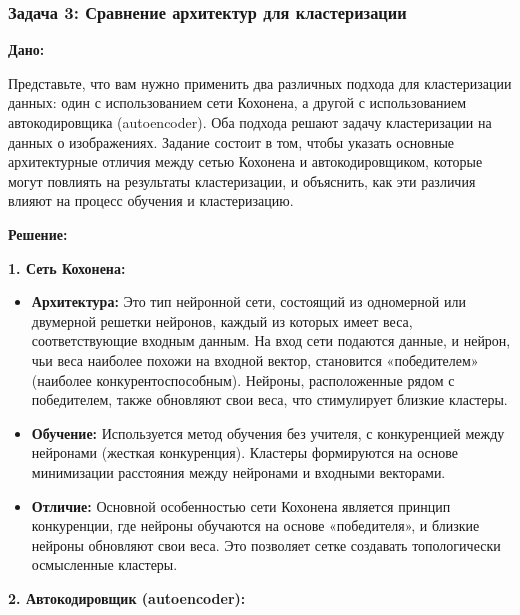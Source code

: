 \subsubsection{Задача 3: Сравнение архитектур для кластеризации}

\textbf{Дано:}

Представьте, что вам нужно применить два различных подхода для кластеризации данных: один с использованием сети Кохонена, а другой с использованием автокодировщика (autoencoder). Оба подхода решают задачу кластеризации на данных о изображениях. Задание состоит в том, чтобы указать основные архитектурные отличия между сетью Кохонена и автокодировщиком, которые могут повлиять на результаты кластеризации, и объяснить, как эти различия влияют на процесс обучения и кластеризацию.

\textbf{Решение:}

\textbf{1. Сеть Кохонена:}

\begin{itemize}
    \item \textbf{Архитектура:} Это тип нейронной сети, состоящий из одномерной или двумерной решетки нейронов, каждый из которых имеет веса, соответствующие входным данным. На вход сети подаются данные, и нейрон, чьи веса наиболее похожи на входной вектор, становится «победителем» (наиболее конкурентоспособным). Нейроны, расположенные рядом с победителем, также обновляют свои веса, что стимулирует близкие кластеры.
    \item \textbf{Обучение:} Используется метод обучения без учителя, с конкуренцией между нейронами (жесткая конкуренция). Кластеры формируются на основе минимизации расстояния между нейронами и входными векторами.
    \item \textbf{Отличие:} Основной особенностью сети Кохонена является принцип конкуренции, где нейроны обучаются на основе «победителя», и близкие нейроны обновляют свои веса. Это позволяет сетке создавать топологически осмысленные кластеры.
\end{itemize}

\textbf{2. Автокодировщик (autoencoder):}

